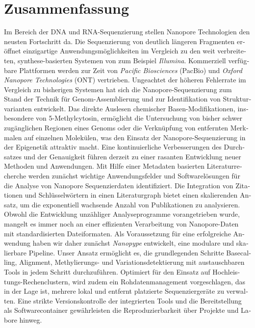 \cleardoublepage
\vspace*{2mm}
\section*{Zusammenfassung}
\label{sec:zusammenfassung}

\begin{otherlanguage}{german}
Im Bereich der DNA und RNA-Sequenzierung stellen Nanopore Technologien den neusten Fortschritt da.
Die Sequenzierung von deutlich längeren Fragmenten eröffnet einzigartige Anwendungsmöglichkeiten im Vergleich zu den weit verbreiteten, synthese-basierten Systemen von zum Beispiel \textit{Illumina}.
Kommerziell verfügbare Plattformen werden zur Zeit von \textit{Pacific Biosciences} (PacBio) und \textit{Oxford Nanopore Technologies} (ONT) vertrieben.
Ungeachtet der höheren Fehlerrate im Vergleich zu bisherigen Systemen hat sich die Nanopore-Sequenzierung zum Stand der Technik für Genom-Assemblierung und zur Identifikation von Strukturvarianten entwickelt.
Das direkte Auslesen chemischer Basen-Modifikationen, insbesondere von 5-Methylcytosin, ermöglicht die Untersuchung von bisher schwer zugänglichen Regionen eines Genoms oder die Verknüpfung von entfernten Merkmalen auf einzelnen Molekülen, was den Einsatz der Nanopore-Sequenzierung in der Epigenetik attraktiv macht.
Eine kontinuierliche Verbesserungen des Durchsatzes und der Genauigkeit führen derzeit zu einer rasanten Entwicklung neuer Methoden und Anwendungen.
Mit Hilfe einer Metadaten basierten Literaturrecherche werden zunächst wichtige Anwendungsfelder und Softwarelösungen für die Analyse von Nanopore Sequenzierdaten identifiziert.
Die Integration von Zitationen und Schlüsselwörtern in einen Literaturgraph bietet einen skalierenden Ansatz, um die exponentiell wachsende Anzahl von Publikationen zu analysieren.
Obwohl die Entwicklung unzähliger Analyseprogramme vorangetrieben wurde, mangelt es immer noch an einer effizienten Verarbeitung von Nanopore-Daten mit standardisierten Dateiformaten.
Als Voraussetzung für eine erfolgreiche Anwendung haben wir daher zunächst \textit{Nanopype} entwickelt, eine modulare und skalierbare Pipeline.
Unser Ansatz ermöglicht es, die grundlegenden Schritte Basecalling, Alignment, Methylierungs- und Variationsdetektierung mit austauschbaren Tools in jedem Schritt durchzuführen.
Optimiert für den Einsatz auf Hochleistungs-Rechenclustern, wird zudem ein Rohdatenmanagement vorgeschlagen, das in der Lage ist, mehrere lokal und entfernt platzierte Sequenziergeräte zu verwalten.
Eine strikte Versionskontrolle der integrierten Tools und die Bereitstellung als Softwarecontainer gewährleisten die Reproduzierbarkeit über Projekte und Labore hinweg.

\end{otherlanguage}
